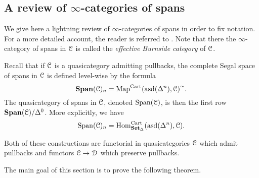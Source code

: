 \documentclass[main.tex]{subfiles}
\begin{document}
\subsection{A review of \texorpdfstring{$\infty$}{infinity}-categories of spans}
\label{ssc:a_review_of_infinity_categories_of_spans}

We give here a lightning review of $\infty$-categories of spans in order to fix notation. For a more detailed account, the reader is referred to \cite[Sec.\ 3]{spectralmackeyfunctors1}. Note that there the $\infty$-category of spans in $\mathcal{C}$ is called the \emph{effective Burnside category} of $\mathcal{C}$.

Recall that if $\mathcal{C}$ is a quasicategory admitting pullbacks, the complete Segal space of spans in $\mathcal{C}$ is defined level-wise by the formula
\begin{equation*}
  \mathbf{Span}(\mathcal{C})_{n} = \mathrm{Map}^{\mathrm{Cart}}(\mathrm{asd}(\Delta^{n}), \mathcal{C})^{\simeq}.
\end{equation*}
The quasicategory of spans in $\mathcal{C}$, denoted $\mathrm{Span}(\mathcal{C})$, is then the first row $\mathbf{Span}(\mathcal{C}) / \Delta^{0}$. More explicitly, we have
\begin{equation*}
  \mathrm{Span}(\mathcal{C})_{n} = \mathrm{Hom}_{\mathbf{Set}_{\Delta}}^{\mathrm{Cart}}(\mathrm{asd}(\Delta^{n}), \mathcal{C}).
\end{equation*}

Both of these constructions are functorial in quasicategories $\mathcal{C}$ which admit pullbacks and functors $\mathcal{C} \to \mathcal{D}$ which preserve pullbacks.

The main goal of this section is to prove the following theorem.
\end{document}
